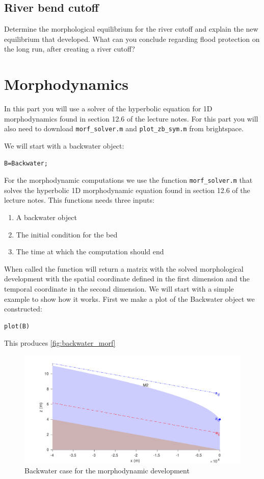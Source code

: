 \documentclass[a4paper]{article}
\begin{document}
\subsection{River bend cutoff}

\begin{exercise}
  Determine the morphological equilibrium for the river cutoff and explain the new equilibrium that developed. What can you conclude regarding flood protection on the long run, after creating a river cutoff?
\end{exercise}

\section{Morphodynamics}
In this part you will use a solver of the hyperbolic equation for 1D morphodynamics found in section 12.6 of the lecture notes. For this part you will also need to download \lstinline{morf_solver.m} and \lstinline{plot_zb_sym.m} from brightspace.

We will start with a backwater object:
\begin{lstlisting}
B=Backwater;
\end{lstlisting}
For the morphodynamic computations we use the function \lstinline{morf_solver.m} that solves the hyperbolic 1D morphodynamic equation found in section 12.6 of the lecture notes.
This functions needs three inputs:
\begin{enumerate}
  \item A backwater object
  \item The initial condition for the bed
  \item The time at which the computation should end
\end{enumerate}
When called the function will return a matrix with the solved morphological development with the spatial coordinate defined in the first dimension and the temporal coordinate in the second dimension.
We will start with a simple example to show how it works. 
First we make a plot of the Backwater object we constructed:
\begin{lstlisting}
plot(B)
\end{lstlisting}
This produces \autoref{fig:backwater_morf}
\begin{figure}[ht]
  \centering
  \includegraphics[width=\linewidth]{matlab/backwater_morf}
  \caption{Backwater case for the morphodynamic development}
  \label{fig:backwater_morf}
\end{figure}
\end{document}
